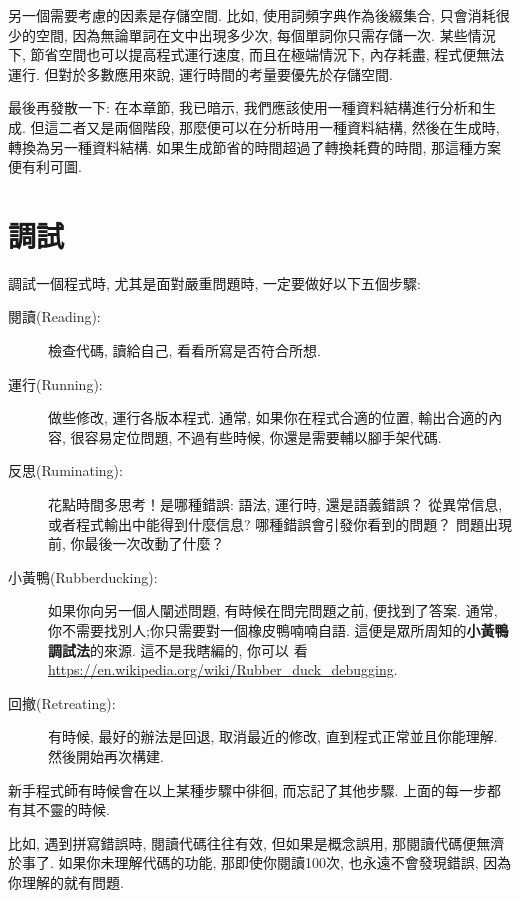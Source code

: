 \documentclass[10pt]{book}
\begin{document}
另一個需要考慮的因素是存儲空間. 
比如, 使用詞頻字典作為後綴集合, 只會消耗很少的空間, 
因為無論單詞在文中出現多少次, 每個單詞你只需存儲一次. 
某些情況下, 節省空間也可以提高程式運行速度, 而且在極端情況下, 
內存耗盡, 程式便無法運行. 但對於多數應用來說, 運行時間的考量要優先於存儲空間. 

最後再發散一下: 在本章節, 我已暗示, 我們應該使用一種資料結構進行分析和生成. 
但這二者又是兩個階段, 那麼便可以在分析時用一種資料結構, 然後在生成時, 
轉換為另一種資料結構. 如果生成節省的時間超過了轉換耗費的時間, 
那這種方案便有利可圖. 


\section{調試}

調試一個程式時, 尤其是面對嚴重問題時, 一定要做好以下五個步驟:

\begin{description}

\item[閱讀(Reading):] 檢查代碼, 讀給自己, 看看所寫是否符合所想. 

\item[運行(Running):] 做些修改, 運行各版本程式. 通常, 如果你在程式合適的位置, 
輸出合適的內容, 很容易定位問題, 不過有些時候, 你還是需要輔以腳手架代碼. 

\item[反思(Ruminating):] 花點時間多思考！是哪種錯誤: 語法, 運行時, 還是語義錯誤？
從異常信息, 或者程式輸出中能得到什麼信息? 哪種錯誤會引發你看到的問題？
問題出現前, 你最後一次改動了什麼？

\item[小黃鴨(Rubberducking):] 如果你向另一個人闡述問題, 有時候在問完問題之前, 
便找到了答案. 
通常, 你不需要找別人;你只需要對一個橡皮鴨喃喃自語. 
這便是眾所周知的{\bf 小黃鴨調試法}的來源. 這不是我瞎編的, 你可以
看\url{https://en.wikipedia.org/wiki/Rubber_duck_debugging}.

\item[回撤(Retreating):] 有時候, 最好的辦法是回退, 
取消最近的修改, 直到程式正常並且你能理解. 然後開始再次構建. 

\end{description}

新手程式師有時候會在以上某種步驟中徘徊, 而忘記了其他步驟. 
上面的每一步都有其不靈的時候. 

比如, 遇到拼寫錯誤時, 閱讀代碼往往有效, 但如果是概念誤用, 那閱讀代碼便無濟於事了. 
如果你未理解代碼的功能, 那即使你閱讀100次, 也永遠不會發現錯誤, 
因為你理解的就有問題. 
\end{document}

